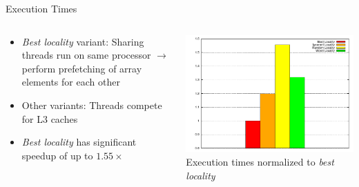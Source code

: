 \begin{frame}{Execution Times}
  \begin{columns}[c]
    \begin{column}{0.49\textwidth}
      \begin{itemize}
      \item \emph{Best locality} variant: Sharing threads run on same
        processor $\rightarrow$ perform prefetching of array elements
        for each other
      \item Other variants: Threads compete for L3 caches
      \item \emph{Best locality} has significant speedup of up to
        $1.55\times$
  \end{itemize}
    \end{column}
    \begin{column}{0.51\textwidth}
      \begin{center}
        \includegraphics[width=\textwidth]{figures/cache-stress-test-threads} \\
        \tiny{Execution times normalized to \emph{best locality}}
      \end{center}
    \end{column}
  \end{columns}
\end{frame}


